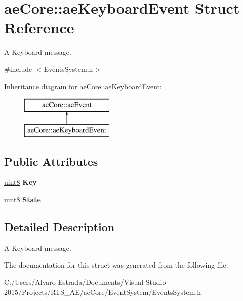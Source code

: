 \hypertarget{structae_core_1_1ae_keyboard_event}{}\section{ae\+Core\+:\+:ae\+Keyboard\+Event Struct Reference}
\label{structae_core_1_1ae_keyboard_event}


A Keyboard message.  




{\ttfamily \#include $<$Events\+System.\+h$>$}

Inheritance diagram for ae\+Core\+:\+:ae\+Keyboard\+Event\+:\begin{figure}[H]
\begin{center}
\leavevmode
\includegraphics[height=2.000000cm]{structae_core_1_1ae_keyboard_event}
\end{center}
\end{figure}
\subsection*{Public Attributes}
\begin{DoxyCompactItemize}
\item 
\hyperlink{namespaceae_core_aa13093dc911869e5b24942552898f01f}{uint8} {\bfseries Key}\hypertarget{structae_core_1_1ae_keyboard_event_abceaa0d341cd16e2f5d4e6e32dd3337a}{}\label{structae_core_1_1ae_keyboard_event_abceaa0d341cd16e2f5d4e6e32dd3337a}

\item 
\hyperlink{namespaceae_core_aa13093dc911869e5b24942552898f01f}{uint8} {\bfseries State}\hypertarget{structae_core_1_1ae_keyboard_event_a90a90d911854e7430baf5c454670dc9a}{}\label{structae_core_1_1ae_keyboard_event_a90a90d911854e7430baf5c454670dc9a}

\end{DoxyCompactItemize}


\subsection{Detailed Description}
A Keyboard message. 

The documentation for this struct was generated from the following file\+:\begin{DoxyCompactItemize}
\item 
C\+:/\+Users/\+Alvaro Estrada/\+Documents/\+Visual Studio 2015/\+Projects/\+R\+T\+S\+\_\+\+A\+E/ae\+Core/\+Event\+System/Events\+System.\+h\end{DoxyCompactItemize}
